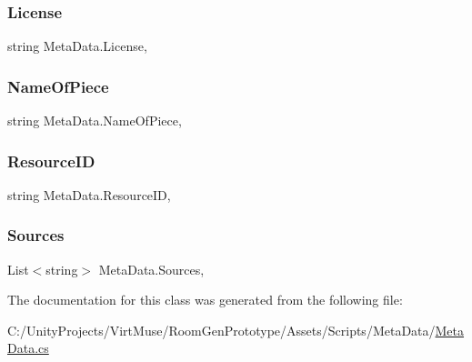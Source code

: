 \mbox{\label{class_meta_data_a43c021341f7ac2b2237041aae37bd3db}} 
\subsubsection{\texorpdfstring{License}{License}}
{\footnotesize\ttfamily string Meta\+Data.\+License\hspace{0.3cm}{\ttfamily [get]}, {\ttfamily [set]}}

\mbox{\label{class_meta_data_abb2ca2ab73300089a68d6c38f5610949}} 
\subsubsection{\texorpdfstring{Name\+Of\+Piece}{NameOfPiece}}
{\footnotesize\ttfamily string Meta\+Data.\+Name\+Of\+Piece\hspace{0.3cm}{\ttfamily [get]}, {\ttfamily [set]}}

\mbox{\label{class_meta_data_a1bbd18efe27fdbeb0ee920414caa12c8}} 
\subsubsection{\texorpdfstring{Resource\+ID}{ResourceID}}
{\footnotesize\ttfamily string Meta\+Data.\+Resource\+ID\hspace{0.3cm}{\ttfamily [get]}, {\ttfamily [set]}}

\mbox{\label{class_meta_data_acb76cf00c140a3da86a35ff350d0c05f}} 
\subsubsection{\texorpdfstring{Sources}{Sources}}
{\footnotesize\ttfamily List$<$string$>$ Meta\+Data.\+Sources\hspace{0.3cm}{\ttfamily [get]}, {\ttfamily [set]}}



The documentation for this class was generated from the following file\+:\begin{DoxyCompactItemize}
\item 
C\+:/\+Unity\+Projects/\+Virt\+Muse/\+Room\+Gen\+Prototype/\+Assets/\+Scripts/\+Meta\+Data/\mbox{\hyperlink{_meta_data_8cs}{Meta\+Data.\+cs}}\end{DoxyCompactItemize}
